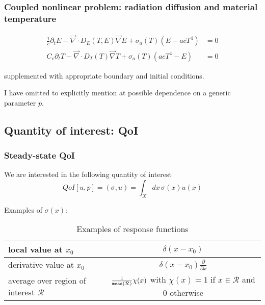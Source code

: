 \documentclass[11pt]{article}
\renewcommand{\div}{\vec{\nabla}\! \cdot \!}
\newcommand{\grad}{\vec{\nabla}}
\newcommand{\be}{\begin{equation}}
\newcommand{\ee}{\end{equation}}
\begin{document}
\subsubsection{Coupled nonlinear problem: radiation diffusion and material temperature}

\begin{align}
\frac{1}{c} \partial_t E - \div D_E(T,E) \grad E + \sigma_a(T)(E-acT^4) &= 0 \\
C_v \partial_t T -\div D_T(T) \grad T +\sigma_a(T)(acT^4-E)            &= 0
\end{align}

supplemented with appropriate boundary and initial conditions.

I have omitted to explicitly mention at possible dependence on a generic parameter $p$.

\subsection{Quantity of interest: QoI}

\subsubsection{Steady-state QoI}

We are interested in the following quantity of interest
\be
QoI[u,p] = (\sigma, u) = \int_X  dx \, \sigma(x)u(x)
\ee

Examples of $\sigma(x)$:
\begin{table*}[!h]
	
	\begin{center}
		\begin{tabular}{|l||c|}
		\hline
	local value at $x_0$ & $\delta(x-x_0)$ \\ \hline
	derivative value at $x_0$ & $\delta(x-x_0) \frac{\partial}{\partial x}$ \\ \hline
	average over region of interest $\mathcal{R}$ & $\frac{1}{\tt{meas}(\mathcal{R})} \chi(x)$ with $\chi(x)=1$ if $x\in\mathcal{R}$ and 0 otherwise \\ \hline
		\end{tabular}
	\end{center}
	\caption{Examples of response functions}
	\label{tab:ExamplesOfResponseFunctions}
\end{table*}
\end{document}
